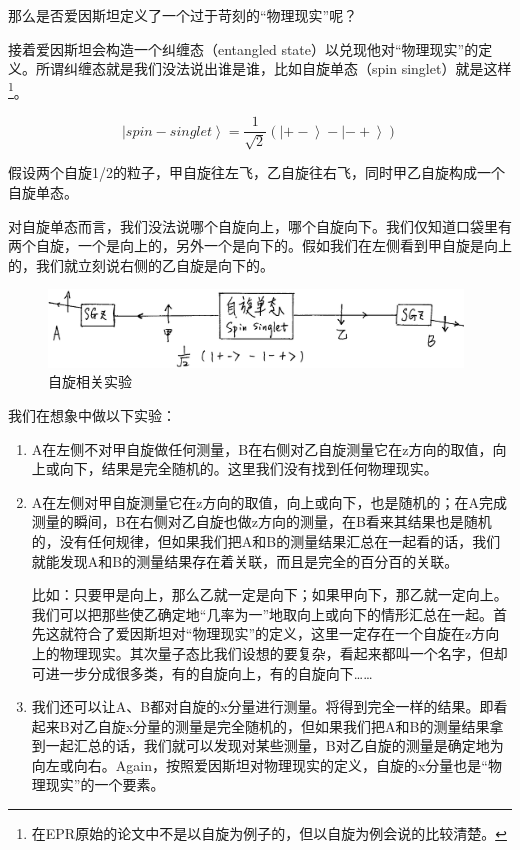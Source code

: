 那么是否爱因斯坦定义了一个过于苛刻的“物理现实”呢？

接着爱因斯坦会构造一个纠缠态（entangled state）以兑现他对“物理现实”的定义。所谓纠缠态就是我们没法说出谁是谁，比如自旋单态（spin singlet）就是这样\footnote{在EPR原始的论文中不是以自旋为例子的，但以自旋为例会说的比较清楚。}。

\begin{equation}
\left| spin-singlet \right\rangle = \frac{1}{\sqrt{2}} \left( \left|+- \right\rangle - \left| - + \right\rangle  \right)
\end{equation}

假设两个自旋1/2的粒子，甲自旋往左飞，乙自旋往右飞，同时甲乙自旋构成一个自旋单态。

对自旋单态而言，我们没法说哪个自旋向上，哪个自旋向下。我们仅知道口袋里有两个自旋，一个是向上的，另外一个是向下的。假如我们在左侧看到甲自旋是向上的，我们就立刻说右侧的乙自旋是向下的。

\begin{figure}[htbp]
\begin{center}
\includegraphics[width=11cm]{DiracNotation/EPRspinsinglet.png}
\caption{自旋相关实验}
\label{default}
\end{center}
\end{figure}

我们在想象中做以下实验：

\begin{enumerate}
\item 

A在左侧不对甲自旋做任何测量，B在右侧对乙自旋测量它在z方向的取值，向上或向下，结果是完全随机的。这里我们没有找到任何物理现实。

\item

A在左侧对甲自旋测量它在z方向的取值，向上或向下，也是随机的；在A完成测量的瞬间，B在右侧对乙自旋也做z方向的测量，在B看来其结果也是随机的，没有任何规律，但如果我们把A和B的测量结果汇总在一起看的话，我们就能发现A和B的测量结果存在着关联，而且是完全的百分百的关联。

比如：只要甲是向上，那么乙就一定是向下；如果甲向下，那乙就一定向上。我们可以把那些使乙确定地“几率为一”地取向上或向下的情形汇总在一起。首先这就符合了爱因斯坦对“物理现实”的定义，这里一定存在一个自旋在z方向上的物理现实。其次量子态比我们设想的要复杂，看起来都叫一个名字，但却可进一步分成很多类，有的自旋向上，有的自旋向下……

\item

我们还可以让A、B都对自旋的x分量进行测量。将得到完全一样的结果。即看起来B对乙自旋x分量的测量是完全随机的，但如果我们把A和B的测量结果拿到一起汇总的话，我们就可以发现对某些测量，B对乙自旋的测量是确定地为向左或向右。Again，按照爱因斯坦对物理现实的定义，自旋的x分量也是“物理现实”的一个要素。

\end{enumerate}

